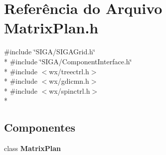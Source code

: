\section{Referência do Arquivo Matrix\+Plan.\+h}
\label{_matrix_plan_8h}
{\ttfamily \#include \char`\"{}S\+I\+G\+A/\+S\+I\+G\+A\+Grid.\+h\char`\"{}}\\*
{\ttfamily \#include \char`\"{}S\+I\+G\+A/\+Component\+Interface.\+h\char`\"{}}\\*
{\ttfamily \#include $<$wx/treectrl.\+h$>$}\\*
{\ttfamily \#include $<$wx/gdicmn.\+h$>$}\\*
{\ttfamily \#include $<$wx/spinctrl.\+h$>$}\\*
\subsection*{Componentes}
\begin{DoxyCompactItemize}
\item 
class {\bf Matrix\+Plan}
\end{DoxyCompactItemize}
